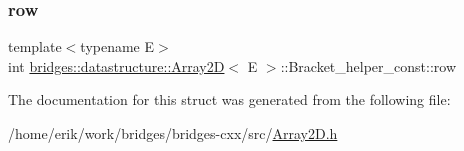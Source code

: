 \subsubsection{\texorpdfstring{row}{row}}
{\footnotesize\ttfamily template$<$typename E$>$ \\
int \hyperlink{classbridges_1_1datastructure_1_1_array2_d}{bridges\+::datastructure\+::\+Array2D}$<$ E $>$\+::Bracket\+\_\+helper\+\_\+const\+::row}



The documentation for this struct was generated from the following file\+:\begin{DoxyCompactItemize}
\item 
/home/erik/work/bridges/bridges-\/cxx/src/\hyperlink{_array2_d_8h}{Array2\+D.\+h}\end{DoxyCompactItemize}
